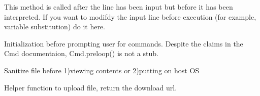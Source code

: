 \documentclass[letterpaper,12pt,openany,oneside]{sphinxmanual}
\begin{document}
\begin{fulllineitems}
\begin{fulllineitems}
\label{main:main.Console.precmd}
This method is called after the line has been input but before
it has been interpreted. If you want to modifdy the input line
before execution (for example, variable substitution) do it here.

\end{fulllineitems}


\begin{fulllineitems}
\label{main:main.Console.preloop}
Initialization before prompting user for commands.
Despite the claims in the Cmd documentaion,
Cmd.preloop() is not a stub.

\end{fulllineitems}


\begin{fulllineitems}
\label{main:main.Console.san_file}
Sanitize file before 1)viewing contents or 2)putting on host OS

\end{fulllineitems}


\begin{fulllineitems}
\label{main:main.Console.upload_file}
Helper function to upload file, return the download url.

\end{fulllineitems}


\end{fulllineitems}


\begin{fulllineitems}
\label{main:main.proxy_parser}
\end{fulllineitems}


\begin{fulllineitems}
\label{main:main.proxy_test}
\end{fulllineitems}
\end{document}
